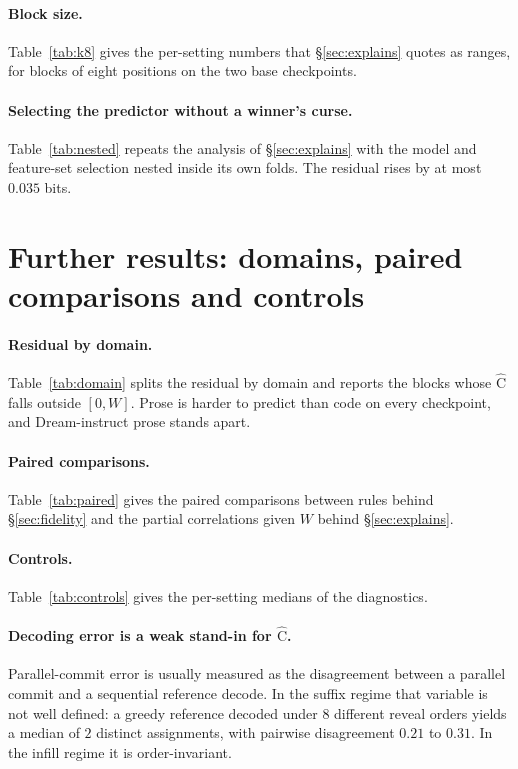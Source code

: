 \documentclass{article}
\newcommand{\C}{\mathrm{C}}
\newcommand{\Chat}{\widehat{\C}}
\begin{document}
\paragraph{Block size.}
\label{app:k8}
Table~\ref{tab:k8} gives the per-setting numbers that \S\ref{sec:explains} quotes as
ranges, for blocks of eight positions on the two base checkpoints.

\paragraph{Selecting the predictor without a winner's curse.}
\label{app:nested}
Table~\ref{tab:nested} repeats the analysis of \S\ref{sec:explains} with the model and
feature-set selection nested inside its own folds. The residual rises by at most
$0.035$ bits.

\section{Further results: domains, paired comparisons and controls}
\label{app:corrections}

\paragraph{Residual by domain.} Table~\ref{tab:domain} splits the residual by domain and
reports the blocks whose $\Chat$ falls outside $[0,W]$. Prose is harder to predict than
code on every checkpoint, and Dream-instruct prose stands apart.


\paragraph{Paired comparisons.} Table~\ref{tab:paired} gives the paired comparisons
between rules behind \S\ref{sec:fidelity} and the partial correlations given $W$ behind
\S\ref{sec:explains}.


\paragraph{Controls.}
\label{app:controls}
Table~\ref{tab:controls} gives the per-setting medians of the diagnostics.


\paragraph{Decoding error is a weak stand-in for $\Chat$.} Parallel-commit error is
usually measured as the disagreement between a parallel commit and a sequential
reference decode. In the suffix regime that variable is not well defined: a greedy
reference decoded under $8$ different reveal orders yields a median of $2$ distinct
assignments, with pairwise disagreement $0.21$ to $0.31$. In the infill regime it is
order-invariant.
\end{document}
